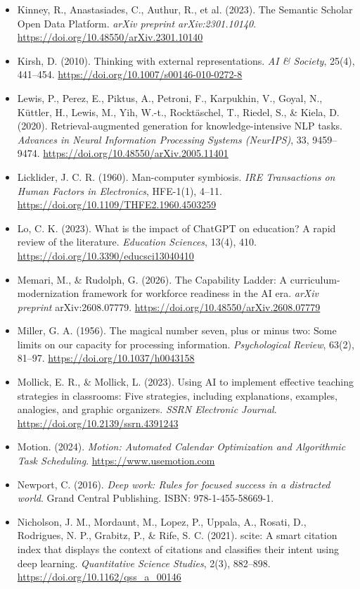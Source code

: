 \begin{itemize}[leftmargin=1.5em, label={}, itemsep=0.22ex, parsep=0pt]
    \item Kinney, R., Anastasiades, C., Authur, R., et al. (2023). The Semantic Scholar Open Data Platform. \textit{arXiv preprint arXiv:2301.10140}. \url{https://doi.org/10.48550/arXiv.2301.10140}
    \item Kirsh, D. (2010). Thinking with external representations. \textit{AI \& Society}, 25(4), 441--454. \url{https://doi.org/10.1007/s00146-010-0272-8}
    \item Lewis, P., Perez, E., Piktus, A., Petroni, F., Karpukhin, V., Goyal, N., K{\"u}ttler, H., Lewis, M., Yih, W.-t., Rockt{\"a}schel, T., Riedel, S., \& Kiela, D. (2020). Retrieval-augmented generation for knowledge-intensive NLP tasks. \textit{Advances in Neural Information Processing Systems (NeurIPS)}, 33, 9459--9474. \url{https://doi.org/10.48550/arXiv.2005.11401}
    \item Licklider, J. C. R. (1960). Man-computer symbiosis. \textit{IRE Transactions on Human Factors in Electronics}, HFE-1(1), 4--11. \url{https://doi.org/10.1109/THFE2.1960.4503259}
    \item Lo, C. K. (2023). What is the impact of ChatGPT on education? A rapid review of the literature. \textit{Education Sciences}, 13(4), 410. \url{https://doi.org/10.3390/educsci13040410}
    \item Memari, M., \& Rudolph, G. (2026). The Capability Ladder: A curriculum-modernization framework for workforce readiness in the AI era. \textit{arXiv preprint} arXiv:2608.07779. \url{https://doi.org/10.48550/arXiv.2608.07779}
    \item Miller, G. A. (1956). The magical number seven, plus or minus two: Some limits on our capacity for processing information. \textit{Psychological Review}, 63(2), 81--97. \url{https://doi.org/10.1037/h0043158}
    \item Mollick, E. R., \& Mollick, L. (2023). Using AI to implement effective teaching strategies in classrooms: Five strategies, including explanations, examples, analogies, and graphic organizers. \textit{SSRN Electronic Journal}. \url{https://doi.org/10.2139/ssrn.4391243}
    \item Motion. (2024). \textit{Motion: Automated Calendar Optimization and Algorithmic Task Scheduling}. \url{https://www.usemotion.com}
    \item Newport, C. (2016). \textit{Deep work: Rules for focused success in a distracted world}. Grand Central Publishing. ISBN: 978-1-455-58669-1.
    \item Nicholson, J. M., Mordaunt, M., Lopez, P., Uppala, A., Rosati, D., Rodrigues, N. P., Grabitz, P., \& Rife, S. C. (2021). scite: A smart citation index that displays the context of citations and classifies their intent using deep learning. \textit{Quantitative Science Studies}, 2(3), 882--898. \url{https://doi.org/10.1162/qss_a_00146}

\end{itemize}
